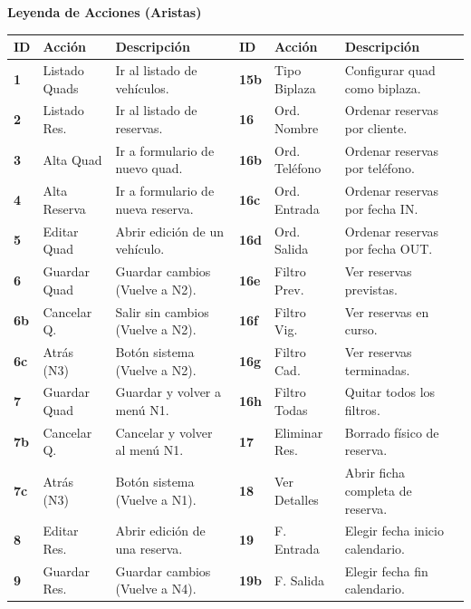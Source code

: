 \documentclass[a4paper,landscape,11pt]{article}
\begin{document}
\begin{minipage}[t][\textheight][t]{\textwidth}
\begin{center}
    \textbf{\Large Leyenda de Acciones (Aristas)} \\[0.3cm]
\begin{minipage}{0.99\textwidth}
\centering
\small
\renewcommand{\arraystretch}{1.1}
\begin{tabularx}{\textwidth}{@{} l l X | l l X @{}}
\toprule
\textbf{ID} & \textbf{Acción} & \textbf{Descripción} & \textbf{ID} & \textbf{Acción} & \textbf{Descripción} \\
\midrule
\textbf{1} & Listado Quads & Ir al listado de vehículos. & \textbf{15b} & Tipo Biplaza & Configurar quad como biplaza. \\
\textbf{2} & Listado Res. & Ir al listado de reservas. & \textbf{16} & Ord. Nombre & Ordenar reservas por cliente. \\
\textbf{3} & Alta Quad & Ir a formulario de nuevo quad. & \textbf{16b} & Ord. Teléfono & Ordenar reservas por teléfono. \\
\textbf{4} & Alta Reserva & Ir a formulario de nueva reserva. & \textbf{16c} & Ord. Entrada & Ordenar reservas por fecha IN. \\
\textbf{5} & Editar Quad & Abrir edición de un vehículo. & \textbf{16d} & Ord. Salida & Ordenar reservas por fecha OUT. \\
\textbf{6} & Guardar Quad & Guardar cambios (Vuelve a N2). & \textbf{16e} & Filtro Prev. & Ver reservas previstas. \\
\textbf{6b} & Cancelar Q. & Salir sin cambios (Vuelve a N2). & \textbf{16f} & Filtro Vig. & Ver reservas en curso. \\
\textbf{6c} & Atrás (N3) & Botón sistema (Vuelve a N2). & \textbf{16g} & Filtro Cad. & Ver reservas terminadas. \\
\textbf{7} & Guardar Quad & Guardar y volver a menú N1. & \textbf{16h} & Filtro Todas & Quitar todos los filtros. \\
\textbf{7b} & Cancelar Q. & Cancelar y volver al menú N1. & \textbf{17} & Eliminar Res. & Borrado físico de reserva. \\
\textbf{7c} & Atrás (N3) & Botón sistema (Vuelve a N1). & \textbf{18} & Ver Detalles & Abrir ficha completa de reserva. \\
\textbf{8} & Editar Res. & Abrir edición de una reserva. & \textbf{19} & F. Entrada & Elegir fecha inicio calendario. \\
\textbf{9} & Guardar Res. & Guardar cambios (Vuelve a N4). & \textbf{19b} & F. Salida & Elegir fecha fin calendario. \\

\end{tabularx}
\end{minipage}
\end{center}
\end{minipage}
\end{document}
